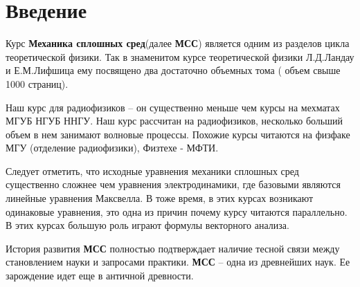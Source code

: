 \section{Введение}

Курс \textbf{Механика сплошных сред}(далее \textbf{\textbf{МСС}}) является одним из разделов цикла теоретической физики.  Так в знаменитом курсе теоретической физики Л.Д.Ландау и Е.М.Лифшица  ему посвящено два достаточно объемных тома ( объем свыше 1000 страниц).

Наш курс для радиофизиков – он существенно меньше чем курсы на мехматах МГУБ НГУБ ННГУ.  Наш  курс рассчитан на радиофизиков, несколько больший объем в нем занимают волновые процессы. Похожие курсы читаются на физфаке МГУ (отделение радиофизики), Физтехе - МФТИ.

Следует отметить, что исходные уравнения механики сплошных сред существенно сложнее чем уравнения электродинамики, где базовыми являются линейные уравнения Максвелла. В тоже время, в этих курсах возникают одинаковые уравнения, это одна из причин почему курсу читаются параллельно. В этих курсах большую роль играют формулы векторного анализа.

История развития \textbf{\textbf{МСС}} полностью подтверждает наличие тесной связи между становлением науки и запросами практики.  \textbf{\textbf{МСС}} – одна из древнейших наук. Ее зарождение идет еще в античной древности.

